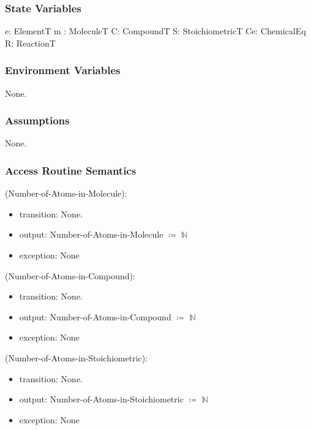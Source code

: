 \documentclass[12pt, titlepage]{article}
\begin{document}
\subsubsection{State Variables}
e: ElementT
\newline
m : MoleculeT 
\newline
C: CompoundT
\newline
S: StoichiometricT
\newline
Ce: ChemicalEq
\newline
R: ReactionT
\subsubsection{Environment Variables}

None.

\subsubsection{Assumptions}

None.

\subsubsection{Access Routine Semantics}

\noindent (Number-of-Atoms-in-Molecule):
\begin{itemize}
\item transition: None.
\item output: Number-of-Atoms-in-Molecule $\coloneqq$ $\mathbb{N}$
\item exception:  None
\end{itemize}

\noindent (Number-of-Atoms-in-Compound):
\begin{itemize}
\item transition: None.
\item output: Number-of-Atoms-in-Compound $\coloneqq$ $\mathbb{N}$
\item exception:  None
\end{itemize}

\noindent (Number-of-Atoms-in-Stoichiometric):
\begin{itemize}
\item transition: None.
\item output: Number-of-Atoms-in-Stoichiometric $\coloneqq$  $\mathbb{N}$
\item exception:  None
\end{itemize}
\end{document}
